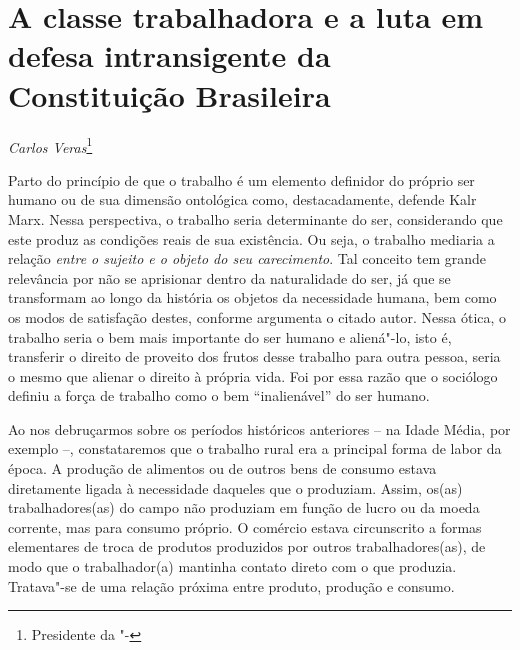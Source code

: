 \chapter*{A classe trabalhadora e a luta em defesa intransigente da
Constituição Brasileira}


\begin{flushright}
\emph{Carlos Veras}\footnote{Presidente da "-}
\end{flushright}

Parto do princípio de que o trabalho é um elemento definidor do próprio
ser humano ou de sua dimensão ontológica como, destacadamente, defende
Kalr Marx. Nessa perspectiva, o trabalho seria determinante do ser,
considerando que este produz as condições reais de sua existência. Ou
seja, o trabalho mediaria a relação \emph{entre o sujeito e o objeto do
seu carecimento}. Tal conceito tem grande relevância por não se
aprisionar dentro da naturalidade do ser, já que se transformam ao longo
da história os objetos da necessidade humana, bem como os modos de
satisfação destes, conforme argumenta o citado autor. Nessa ótica, o
trabalho seria o bem mais importante do ser humano e aliená"-lo, isto é,
transferir o direito de proveito dos frutos desse trabalho para outra
pessoa, seria o mesmo que alienar o direito à própria vida. Foi por essa
razão que o sociólogo definiu a força de trabalho como o bem
``inalienável'' do ser humano.

Ao nos debruçarmos sobre os períodos históricos anteriores -- na Idade
Média, por exemplo --, constataremos que o trabalho rural era a
principal forma de labor da época. A produção de alimentos ou de outros
bens de consumo estava diretamente ligada à necessidade daqueles que o
produziam. Assim, os(as) trabalhadores(as) do campo não produziam em
função de lucro ou da moeda corrente, mas para consumo próprio. O
comércio estava circunscrito a formas elementares de troca de produtos
produzidos por outros trabalhadores(as), de modo que o trabalhador(a)
mantinha contato direto com o que produzia. Tratava"-se de uma relação
próxima entre produto, produção e consumo.

